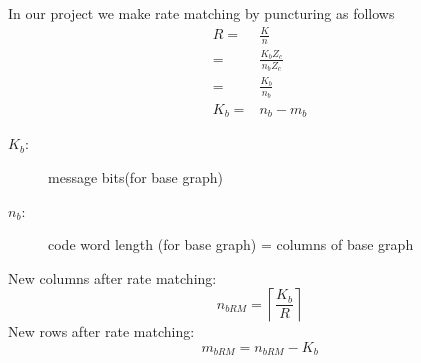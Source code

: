 In our project we make rate matching by puncturing as follows
\begin{equation}
    \label{eq:rate}
    \begin{aligned}
        R = & \frac{K}{n} \\
        = & \frac{K_bZ_c}{n_bZ_c} \\
        = & \frac{K_b}{n_b} \\
        K_b = & n_b - m_b
    \end{aligned}
\end{equation}

\begin{description}
    \item[$K_b$:] message bits(for base graph)
    \item[$n_b$:] code word length (for base graph) = columns of base graph
\end{description}
 
New columns after rate matching:
\begin{equation}
    \label{eq:New columns after rate matching}
    n_{bRM}=\left\lceil\frac{K_b}{R}\right\rceil
\end{equation}
New rows after rate matching:
\begin{equation}
    \label{eq:New rowa after rate matching}
    m_{bRM}=n_{bRM}-K_b
\end{equation}

